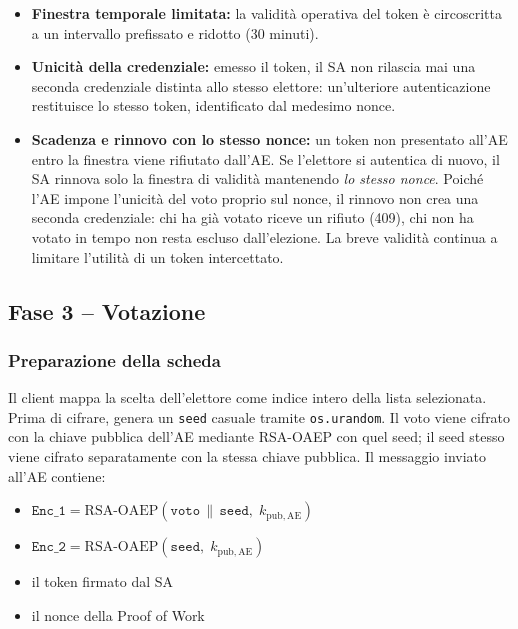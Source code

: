\documentclass[12pt,a4paper]{article}
\begin{document}
\begin{itemize}
  \item \textbf{Finestra temporale limitata:} la validità operativa del token è circoscritta a
    un intervallo prefissato e ridotto (30 minuti).
  \item \textbf{Unicità della credenziale:} emesso il token, il SA non rilascia mai una seconda
    credenziale distinta allo stesso elettore: un'ulteriore autenticazione restituisce lo
    stesso token, identificato dal medesimo nonce.
  \item \textbf{Scadenza e rinnovo con lo stesso nonce:} un token non presentato all'AE entro
    la finestra viene rifiutato dall'AE. Se l'elettore si autentica di nuovo, il SA rinnova
    solo la finestra di validità mantenendo \emph{lo stesso nonce}. Poiché l'AE impone
    l'unicità del voto proprio sul nonce, il rinnovo non crea una seconda credenziale: chi
    ha già votato riceve un rifiuto (409), chi non ha votato in tempo non resta escluso
    dall'elezione. La breve validità continua a limitare l'utilità di un token intercettato.
\end{itemize}

\subsection{Fase 3 – Votazione}

\subsubsection{Preparazione della scheda}

Il client mappa la scelta dell'elettore come indice intero della lista selezionata. Prima di
cifrare, genera un \texttt{seed} casuale tramite \texttt{os.urandom}. Il voto viene cifrato con
la chiave pubblica dell'AE mediante RSA-OAEP con quel seed; il seed stesso viene cifrato
separatamente con la stessa chiave pubblica. Il messaggio inviato all'AE contiene:

\begin{itemize}
  \item $\mathtt{Enc\_1} = \mathrm{RSA\text{-}OAEP}(\mathtt{voto} \,\|\, \mathtt{seed},\; k_{\mathrm{pub,AE}})$
  \item $\mathtt{Enc\_2} = \mathrm{RSA\text{-}OAEP}(\mathtt{seed},\; k_{\mathrm{pub,AE}})$
  \item il token firmato dal SA
  \item il nonce della Proof of Work
\end{itemize}
\end{document}
